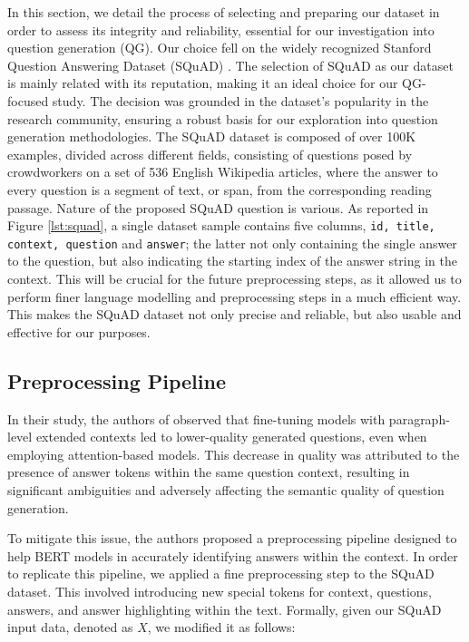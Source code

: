 \documentclass{article}
\begin{document}
In this section, we detail the process of selecting and preparing our dataset in order to assess its integrity and reliability, essential for our investigation into question generation (QG). Our choice fell on the widely recognized Stanford Question Answering Dataset (SQuAD) \cite{rajpurkar-etal-2016-squad}.
The selection of SQuAD as our dataset is mainly related with its reputation, making it an ideal choice for our QG-focused study. The decision was grounded in the dataset's popularity in the research community, ensuring a robust basis for our exploration into question generation methodologies. The SQuAD dataset is composed of over 100K examples, divided across different fields, consisting of questions posed by crowdworkers on a set of 536 English Wikipedia articles, where the answer to every question is a segment of text, or span, from the corresponding reading passage. Nature of the proposed SQuAD question is various. As reported in Figure \ref{lst:squad}, a single dataset sample contains five columns, \texttt{id, title, context, question} and \texttt{answer}; the latter not only containing the single answer to the question, but also indicating the starting index of the answer string in the context. This will be crucial for the future preprocessing steps, as it allowed us to perform finer language modelling and preprocessing steps in a much efficient way. This makes the SQuAD dataset not only precise and reliable, but also usable and effective for our purposes.



\subsection{Preprocessing Pipeline}
In their study, the authors of \cite{chan-fan-2019-recurrent} observed that fine-tuning models with paragraph-level extended contexts led to lower-quality generated questions, even when employing attention-based models. This decrease in quality was attributed to the presence of answer tokens within the same question context, resulting in significant ambiguities and adversely affecting the semantic quality of question generation.

To mitigate this issue, the authors proposed a preprocessing pipeline designed to help BERT models in accurately identifying answers within the context. In order to replicate this pipeline, we applied a fine preprocessing step to the SQuAD dataset. This involved introducing new special tokens for context, questions, answers, and answer highlighting within the text. Formally, given our SQuAD input data, denoted as $X$, we modified it as follows:
\end{document}
